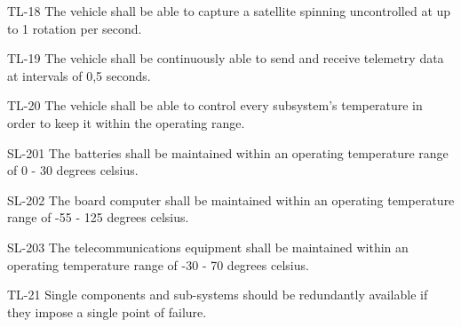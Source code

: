 \documentclass{article}
\begin{document}
TL-18 The vehicle shall be able to capture a satellite spinning uncontrolled at up to 1 rotation per second.

TL-19  The vehicle shall be continuously able to send and receive telemetry data at intervals of 0,5 seconds.

TL-20 The vehicle shall be able to control every subsystem's temperature in order to keep it within the operating range.

    SL-201 The batteries shall be maintained within an operating temperature range of 0 - 30 degrees celsius.
    
    SL-202 The board computer shall be maintained within an operating temperature range of -55 - 125 degrees celsius.
    
    SL-203 The telecommunications equipment shall be maintained within an operating temperature range of -30 - 70 degrees celsius.

TL-21 Single components and sub-systems should be redundantly available if they impose a single point of failure.
\end{document}
